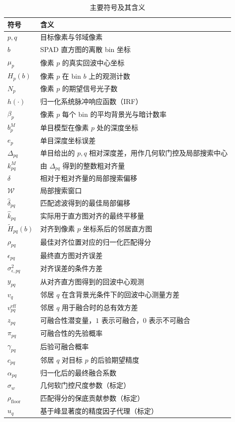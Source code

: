 \documentclass[11pt,a4paper]{ctexart}
\numberwithin{equation}{section}
\begin{document}
\begin{table}[htbp]
    \centering
    \caption{主要符号及其含义}
    \label{tab:notation}
    \begin{tabular}{ll}
        \toprule
        符号 & 含义 \\
        \midrule
        $p,q$ & 目标像素与邻域像素 \\
        $b$ & SPAD 直方图的离散 bin 坐标 \\
        $\mu_p$ & 像素 $p$ 的真实回波中心坐标 \\
        $H_p(b)$ & 像素 $p$ 在 bin $b$ 上的观测计数 \\
        $N_p$ & 像素 $p$ 的期望信号光子数 \\
        $h(\cdot)$ & 归一化系统脉冲响应函数（IRF） \\
        $\beta_p$ & 像素 $p$ 每个 bin 的平均背景光与暗计数率 \\
        $b_p^M$ & 单目模型在像素 $p$ 处的深度坐标 \\
        $e_p$ & 单目深度坐标误差 \\
        $\Delta_{pq}$ & 单目给出的 $p,q$ 相对深度差，用作几何软门控及局部搜索中心 \\
        $k_{pq}^{M}$ & 由 $\Delta_{pq}$ 得到的整数粗对齐量 \\
        $\delta$ & 相对于粗对齐量的局部搜索偏移 \\
        $\mathcal W$ & 局部搜索窗口 \\
        $\hat\delta_{pq}$ & 匹配滤波得到的最佳局部偏移 \\
        $\hat k_{pq}$ & 实际用于直方图对齐的最终平移量 \\
        $\widetilde H_{pq}(b)$ & 对齐到像素 $p$ 坐标系后的邻居直方图 \\
        $\rho_{pq}$ & 最佳对齐位置对应的归一化匹配得分 \\
        $\epsilon_{pq}$ & 最终直方图对齐误差 \\
        $\sigma_{\epsilon,pq}^{2}$ & 对齐误差的条件方差 \\
        $y_{pq}$ & 从对齐直方图得到的回波中心观测 \\
        $v_q$ & 邻居 $q$ 在含背景光条件下的回波中心测量方差 \\
        $v_{pq}^{\mathrm{eff}}$ & 邻居 $q$ 用于融合时的总有效方差 \\
        $z_{pq}$ & 可融合性潜变量，$1$ 表示可融合，$0$ 表示不可融合 \\
        $\pi_{pq}$ & 可融合性的先验概率 \\
        $\gamma_{pq}$ & 后验可融合概率 \\
        $c_{pq}$ & 邻居 $q$ 对目标 $p$ 的后验期望精度 \\
        $\alpha_{pq}$ & 归一化后的最终融合系数 \\
        \midrule
        $\sigma_w$ & 几何软门控尺度参数（标定） \\
        $\rho_{\mathrm{floor}}$ & 匹配得分的保底贡献参数（标定） \\
        $\hat u_q$ & 基于峰显著度的精度因子代理（标定） \\
        \bottomrule
    \end{tabular}
\end{table}
\end{document}
